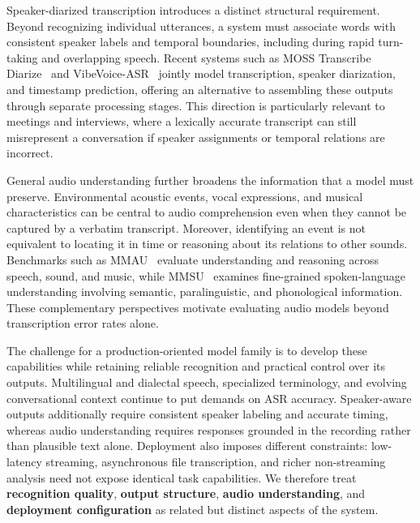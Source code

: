 \documentclass{article}
\begin{document}
Speaker-diarized transcription introduces a distinct structural requirement. Beyond recognizing individual utterances, a system must associate words with consistent speaker labels and temporal boundaries, including during rapid turn-taking and overlapping speech. Recent systems such as MOSS Transcribe Diarize~\citep{q31_mosi2026mosstd} and VibeVoice-ASR~\citep{q31_peng2026vibevoice} jointly model transcription, speaker diarization, and timestamp prediction, offering an alternative to assembling these outputs through separate processing stages. This direction is particularly relevant to meetings and interviews, where a lexically accurate transcript can still misrepresent a conversation if speaker assignments or temporal relations are incorrect.

General audio understanding further broadens the information that a model must preserve. Environmental acoustic events, vocal expressions, and musical characteristics can be central to audio comprehension even when they cannot be captured by a verbatim transcript. Moreover, identifying an event is not equivalent to locating it in time or reasoning about its relations to other sounds. Benchmarks such as MMAU~\citep{q31_sakshi2024mmau} evaluate understanding and reasoning across speech, sound, and music, while MMSU~\citep{q31_wang2025mmsu} examines fine-grained spoken-language understanding involving semantic, paralinguistic, and phonological information. These complementary perspectives motivate evaluating audio models beyond transcription error rates alone.

The challenge for a production-oriented model family is to develop these capabilities while retaining reliable recognition and practical control over its outputs. Multilingual and dialectal speech, specialized terminology, and evolving conversational context continue to put demands on ASR accuracy. Speaker-aware outputs additionally require consistent speaker labeling and accurate timing, whereas audio understanding requires responses grounded in the recording rather than plausible text alone. Deployment also imposes different constraints: low-latency streaming, asynchronous file transcription, and richer non-streaming analysis need not expose identical task capabilities. We therefore treat \textbf{recognition quality}, \textbf{output structure}, \textbf{audio understanding}, and \textbf{deployment configuration} as related but distinct aspects of the system.
\end{document}
